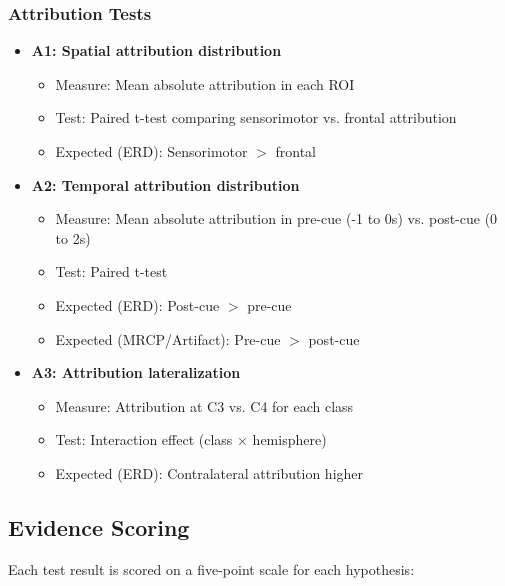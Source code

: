 \subsubsection{Attribution Tests}

\begin{itemize}
    \item \textbf{A1: Spatial attribution distribution}
    \begin{itemize}
        \item Measure: Mean absolute attribution in each ROI
        \item Test: Paired t-test comparing sensorimotor vs. frontal attribution
        \item Expected (ERD): Sensorimotor $>$ frontal
    \end{itemize}
    
    \item \textbf{A2: Temporal attribution distribution}
    \begin{itemize}
        \item Measure: Mean absolute attribution in pre-cue (-1 to 0s) vs. post-cue (0 to 2s)
        \item Test: Paired t-test
        \item Expected (ERD): Post-cue $>$ pre-cue
        \item Expected (MRCP/Artifact): Pre-cue $>$ post-cue
    \end{itemize}
    
    \item \textbf{A3: Attribution lateralization}
    \begin{itemize}
        \item Measure: Attribution at C3 vs. C4 for each class
        \item Test: Interaction effect (class $\times$ hemisphere)
        \item Expected (ERD): Contralateral attribution higher
    \end{itemize}
\end{itemize}


\subsection{Evidence Scoring}
\label{subsec:methods_scoring}

Each test result is scored on a five-point scale for each hypothesis:

